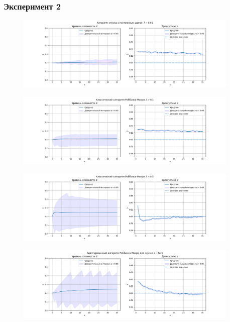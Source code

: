 \subsubsection{Эксперимент 2}
\begin{figure}[h!]
    \centering
    \includegraphics[width=0.95\textwidth]{assets/work/rating/2/fixed.png}
    \label{exp2:fixed}
\end{figure}
\begin{figure}[h!]
    \centering
    \includegraphics[width=0.95\textwidth]{assets/work/rating/2/lambda_0.1.png}
    \label{exp2:lambda_0.1}
\end{figure}
\begin{figure}[h!]
    \centering
    \includegraphics[width=0.95\textwidth]{assets/work/rating/2/lambda_0.5.png}
    \label{exp2:lambda_0.5}
\end{figure}
\begin{figure}[h!]
    \centering
    \includegraphics[width=0.95\textwidth]{assets/work/rating/2/adaptive.png}
    \label{exp2:adaptive}
\end{figure}
\pagebreak
